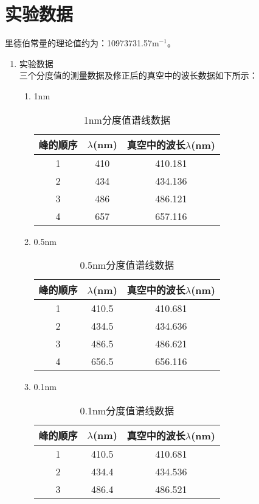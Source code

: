 \documentclass[a4paper]{article}
\begin{document}
\section{实验数据}
里德伯常量的理论值约为：10973731.57$\text{m}^{-1}$。
\begin{enumerate}
\item 实验数据\\
三个分度值的测量数据及修正后的真空中的波长数据如下所示：
\begin{enumerate}
\item 1nm
\begin{table}[!h]
\centering
\caption{1nm分度值谱线数据}
\label{table_1nm}
\begin{tabular}{|c|c|c|}
\hline
峰的顺序    &  $\lambda$(nm)  & 真空中的波长$\lambda$(nm) \\ \hline
1   & 410            & 410.181 \\ \hline
2   & 434              & 434.136 \\ \hline
3   & 486             & 486.121 \\ \hline
4   & 657              & 657.116 \\ \hline
\end{tabular}
\end{table}
\item 0.5nm
\begin{table}[!h]
\centering
\caption{0.5nm分度值谱线数据}
\label{table_05nm}
\begin{tabular}{|c|c|c|}
\hline
峰的顺序    &  $\lambda$(nm)  & 真空中的波长$\lambda$(nm) \\ \hline
1   & 410.5            & 410.681 \\ \hline
2   & 434.5             & 434.636 \\ \hline
3   & 486.5             & 486.621 \\ \hline
4   & 656.5              & 656.116 \\ \hline
\end{tabular}
\end{table}
\item 0.1nm
\begin{table}[!h]
\centering
\caption{0.1nm分度值谱线数据}
\label{table_01nm}
\begin{tabular}{|c|c|c|}
\hline
峰的顺序    &  $\lambda$(nm)  & 真空中的波长$\lambda$(nm) \\ \hline
1   & 410.5            & 410.681 \\ \hline
2   & 434.4             & 434.536 \\ \hline
3   & 486.4             & 486.521 \\ \hline

\end{tabular}
\end{table}
\end{enumerate}
\end{enumerate}
\end{document}
